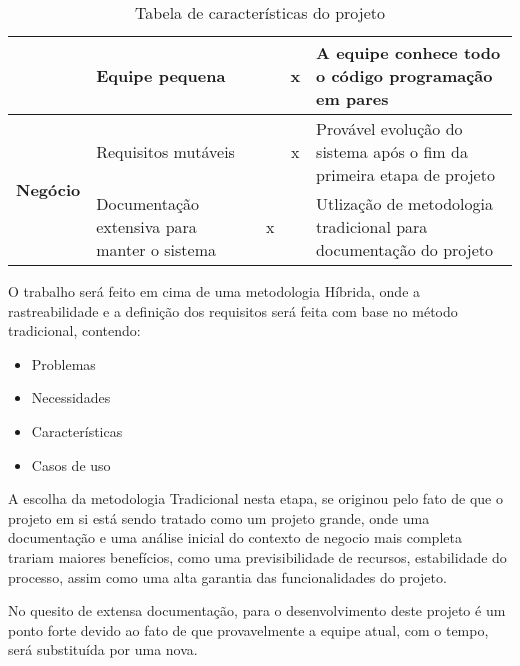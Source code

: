\begin{table}[h]
\begin{tabular}{|p{2cm}|p{5cm}|c|c|p{4cm}|}
                \cline{2-5} 
                 &
                Equipe pequena &
                 &
                x &
                A equipe conhece todo o código programação em pares
                \\
                \hline
        \multirow{2}{*}{
            \textbf{Negócio}}
                 &
                Requisitos mutáveis &
                 &
                x &
                Provável evolução do sistema após o fim da primeira etapa de projeto
                \\
                \cline{2-5}
                 &
                Documentação extensiva para manter o sistema &
                x &
                 &
                Utlização de metodologia tradicional para documentação do projeto
                \\
                \hline
    \end{tabular}
    \caption{Tabela de características do projeto}
    \label{tab:caracteristcas_do_projeto}
\end{table}

O trabalho será feito em cima de uma metodologia Híbrida, onde a rastreabilidade e a definição dos requisitos será feita com base no método 
tradicional, contendo:

\begin{itemize}
    \item{Problemas}
    \item{Necessidades}
    \item{Características}
    \item{Casos de uso}
\end{itemize}

A escolha da metodologia Tradicional nesta etapa, se originou pelo fato de que o projeto em si está sendo tratado como um projeto grande, onde uma documentação e uma análise inicial do contexto de negocio mais completa trariam maiores benefícios, como uma previsibilidade de recursos, estabilidade do processo, assim como uma alta garantia das funcionalidades do projeto.

No quesito de extensa documentação, para o desenvolvimento deste projeto é um ponto forte devido ao fato de que provavelmente a equipe atual, com o tempo, será substituída por uma nova.

